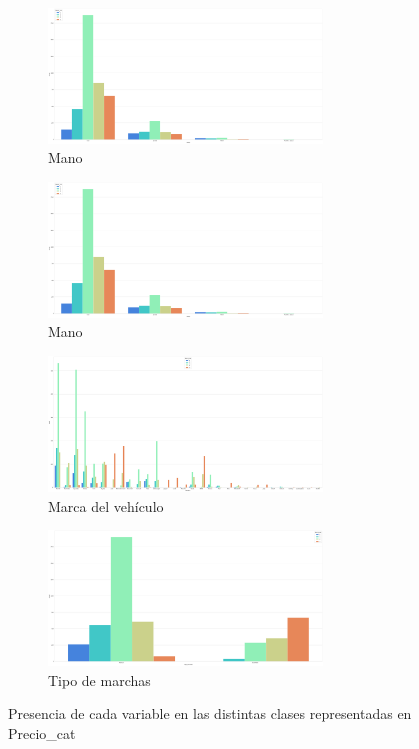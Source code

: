 \begin{figure}[H]
\begin{subfigure}{.5\textwidth}
  \centering
  \includegraphics[width=0.8\textwidth]{imagenes/features/Mano.png}
  \caption{Mano}
\end{subfigure}%
\begin{subfigure}{.5\textwidth}
  \centering
  \includegraphics[width=0.8\textwidth]{imagenes/features/Mano.png}
  \caption{Mano}
\end{subfigure}
\begin{subfigure}{.5\textwidth}
  \centering
  \includegraphics[width=0.8\textwidth]{imagenes/features/Nombre.png}
  \caption{Marca del vehículo}
\end{subfigure}%
\begin{subfigure}{.5\textwidth}
  \centering
  \includegraphics[width=0.8\textwidth]{imagenes/features/Tipo_Marchas.png}
  \caption{Tipo de marchas}
\end{subfigure}

\caption{Presencia de cada variable en las distintas clases representadas en Precio\_cat}
\label{fig:fig}
\end{figure}

